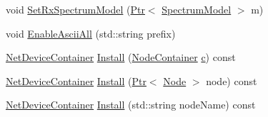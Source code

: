\begin{DoxyCompactItemize}
\item 
void \hyperlink{classns3_1_1SpectrumAnalyzerHelper_afcfa897fb4c298b02e39ec87717b0b54}{Set\+Rx\+Spectrum\+Model} (\hyperlink{classns3_1_1Ptr}{Ptr}$<$ \hyperlink{classns3_1_1SpectrumModel}{Spectrum\+Model} $>$ m)
\item 
void \hyperlink{classns3_1_1SpectrumAnalyzerHelper_ad1bb3c14843583ce1227e00758d8ba51}{Enable\+Ascii\+All} (std\+::string prefix)
\item 
\hyperlink{classns3_1_1NetDeviceContainer}{Net\+Device\+Container} \hyperlink{classns3_1_1SpectrumAnalyzerHelper_a64479eb63eb6b5ad5536ee8ecf2c717a}{Install} (\hyperlink{classns3_1_1NodeContainer}{Node\+Container} \hyperlink{mmwave_2model_2fading-traces_2fading__trace__generator_8m_ae0323a9039add2978bf5b49550572c7c}{c}) const 
\item 
\hyperlink{classns3_1_1NetDeviceContainer}{Net\+Device\+Container} \hyperlink{classns3_1_1SpectrumAnalyzerHelper_ab0cee5b2df25931495f12402ca698056}{Install} (\hyperlink{classns3_1_1Ptr}{Ptr}$<$ \hyperlink{classns3_1_1Node}{Node} $>$ node) const 
\item 
\hyperlink{classns3_1_1NetDeviceContainer}{Net\+Device\+Container} \hyperlink{classns3_1_1SpectrumAnalyzerHelper_a89359a0aff601ddc79f1a2e715a9b7b3}{Install} (std\+::string node\+Name) const 
\end{DoxyCompactItemize}
